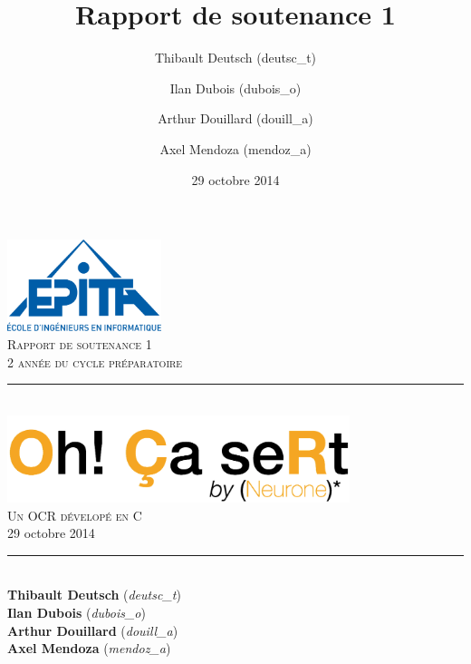 \documentclass[11pt]{report}
\title{Rapport de soutenance 1}
\author{Thibault Deutsch (deutsc\_t) \and Ilan Dubois (dubois\_o) \and Arthur Douillard (douill\_a) \and Axel Mendoza (mendoz\_a)}
\date{29 octobre 2014}
\begin{document}
\renewcommand{\labelitemi}{$\bullet$}

\begin{titlepage}
\newcommand{\HRule}{\rule{\linewidth}{0.5mm}} %

\flushright
\includegraphics[width = 4.5cm]{epita.png}\\[0.5cm] %

\textsc{\Large Rapport de soutenance 1}\\[0.15cm] %
\textsc{\large 2 année du cycle préparatoire}\\[3cm] %

\center
\HRule \\[0.5cm]
\includegraphics[width = 10cm]{logo.png}\\[1cm]
\textsc{\Large Un OCR dévelopé en C}\\[0.1cm]
\large 29 octobre 2014\\[0.1cm]
\HRule \\[3cm]

\Large
\textbf{Thibault Deutsch} (\emph{deutsc\_t}) \\
\textbf{Ilan Dubois} (\emph{dubois\_o}) \\
\textbf{Arthur Douillard} (\emph{douill\_a}) \\
\textbf{Axel Mendoza} (\emph{mendoz\_a})\\[2cm]

\vfill %

\end{titlepage}
\end{document}
